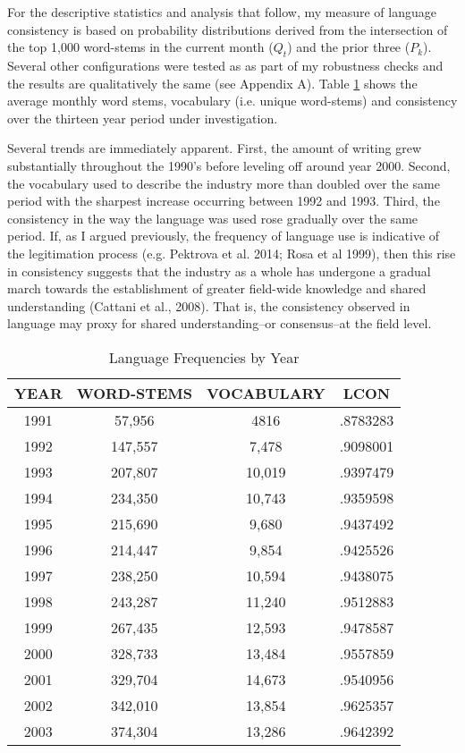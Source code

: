 For the descriptive statistics and analysis that follow, my measure of language consistency is based on probability distributions derived from the intersection of the top 1,000 word-stems in the current month ($Q_t$) and the prior three ($P_k$). Several other configurations were tested as as part of my robustness checks and the results are qualitatively the same (see Appendix A). Table \ref{freq} shows the average monthly word stems, vocabulary (i.e. unique word-stems) and consistency over the thirteen year period under investigation.

Several trends are immediately apparent. First, the amount of writing grew substantially throughout the 1990's before leveling off around year 2000. Second, the vocabulary used to describe the industry more than doubled over the same period with the sharpest increase occurring between 1992 and 1993. Third, the consistency in the way the language was used rose gradually over the same period. If, as I argued previously, the frequency of language use is indicative of the legitimation process (e.g. Pektrova et al. 2014; Rosa et al 1999), then this rise in consistency suggests that the industry as a whole has undergone a gradual march towards the establishment of greater field-wide knowledge and shared understanding (Cattani et al., 2008). That is, the consistency observed in language may proxy for shared understanding--or consensus--at the field level.

\begin{table}
\begin{center}
\caption[Language Frequencies by Year]{Language Frequencies by Year \label{freq}}
\vspace{0.3in}
\begin{tabular}{cccc}
\hline 
\hline
YEAR & WORD-STEMS & VOCABULARY & LCON \\
\hline
1991 & 57,956 & 4816 & .8783283 \\
1992	 & 147,557 & 7,478 & .9098001 \\
1993 &  207,807 & 10,019 & .9397479 \\
1994 &  234,350 & 10,743 & .9359598 \\
1995 &  215,690 & 9,680 & .9437492 \\
1996 &  214,447 & 9,854 & .9425526 \\
1997 &  238,250 & 10,594 & .9438075 \\
1998 &  243,287 & 11,240 & .9512883 \\
1999 &  267,435 & 12,593 & .9478587 \\
2000 &  328,733 & 13,484 & .9557859 \\
2001 &  329,704 & 14,673 & .9540956 \\
2002 &  342,010 & 13,854 & .9625357 \\
2003 &  374,304 & 13,286 & .9642392 \\
\hline
\end{tabular}
\end{center}
\end{table}



